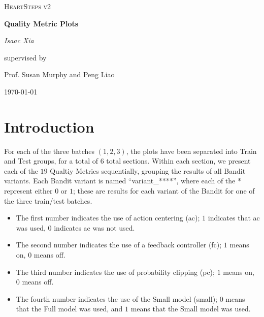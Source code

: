 \documentclass{DissertateFigs}
\begin{document}
\begin{titlepage}
    \centering
    \vspace{1cm}
    {\scshape\Large HeartSteps v2\par}
    \vspace{1.5cm}
    {\huge\bfseries Quality Metric Plots\par}
    \vspace{2cm}
    {\Large\itshape Isaac Xia\par}
    \vfill
    supervised by\par
    Prof. Susan Murphy and Peng Liao

    \vfill

    {\large \today\par}
\end{titlepage}

\section{Introduction}

For each of the three batches $(1,2,3)$, the plots have been separated into Train and Test groups, for a total of $6$ total sections.  Within each section, we present each of the $19$ Qualtiy Metrics sequentially, grouping the results of all Bandit variants. Each Bandit variant is named ``variant\_****'', where each of the * represent either $0$ or $1$; these are results for each variant of the Bandit for one of the three train/test batches.

\begin{itemize}
    \item The first number indicates the use of action centering (ac); $1$ indicates that ac was used, $0$ indicates ac was not used.
    \item The second number indicates the use of a feedback controller (fc); $1$ means on, $0$ means off.
    \item The third number indicates the use of probability clipping (pc); $1$ means on, $0$ means off.
    \item The fourth number indicates the use of the Small model (small); $0$ means that the Full model was used, and $1$ means that the Small model was used.
\end{itemize}
\end{document}
